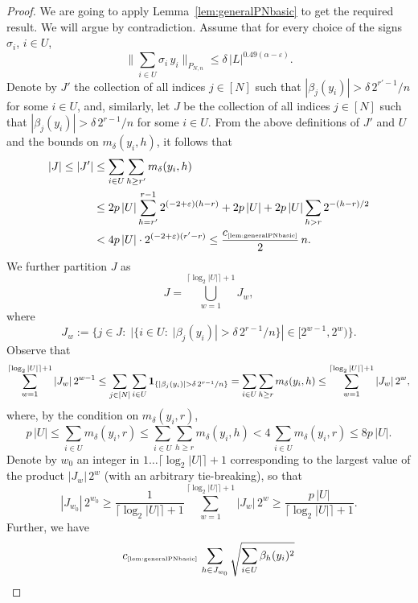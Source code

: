 \documentclass[11pt]{amsart}
\theoremstyle{definition}
\theoremstyle{plain}
\begin{document}
\begin{proof}
We are going to apply Lemma~\ref{lem:generalPNbasic}
to get the required result.
We will argue by contradiction.
Assume that for every
choice of the signs $\sigma_i$, $i\in U$,
\begin{equation}\label{eq:oajhbfoajhfboajsflaknf}
\Big\|\sum_{i\in U}\sigma_i\,y_i\Big\|_{P_{N,n}}
\leq \delta\,|L|^{0.49(\alpha-\varepsilon)}.    
\end{equation}
Denote by $J'$ the collection of all indices $j\in[N]$
such that 
$|\beta_j(y_i)|>\delta\,2^{r'-1}/n$
for some $i\in U$,
and, similarly, let $J$
be the collection of all indices $j\in[N]$
such that 
$|\beta_j(y_i)|>\delta\,2^{r-1}/n$
for some $i\in U$.
From the above definitions of $J'$ and $U$
and the bounds on $m_\delta(y_i,h)$, it follows that
\begin{equation}\label{eq: JJprimesize}
\begin{split}
|J|\leq
|J'|&\leq 
\sum_{i\in U}
\sum_{h\geq r'}
m_\delta(y_i,h)\\
&\leq
2p\,|U|
\sum_{h=r'}^{r-1} 2^{(-2+\varepsilon)(h-r)}
+2p\,|U|+2p\,|U|\sum_{h>r} 2^{-(h-r)/2}\\
&<
4p\,|U|
\cdot 2^{(-2+\varepsilon)(r'-r)}
\leq \frac{c_{\text{\tiny\ref{lem:generalPNbasic}}}}{2}\,n.
\end{split}
\end{equation}
We further partition $J$ as
$$
J=\bigcup\limits_{w=1}^{\lceil\log_2|U|\rceil+1} J_w,
$$
where
$$
J_w:=\big\{j\in J:\;
|\{i\in U:\;|\beta_j(y_i)|>\delta\,2^{r-1}/n\}|
\in[2^{w-1},2^w)\big\}.
$$
Observe that
$$
\sum_{w=1}^{\lceil\log_2|U|\rceil+1}
|J_w|\,2^{w-1}
\leq
\sum_{j\in[N]}\sum_{i\in U}
{\bf 1}_{\{|\beta_j(y_i)|>\delta\,2^{r-1}/n\}}
=\sum_{i\in U}\sum_{h\geq r}m_\delta(y_i,h)
\leq \sum_{w=1}^{\lceil\log_2|U|\rceil+1}
|J_w|\,2^{w},
$$
where, by the condition on $m_\delta(y_i,r)$,
$$
p\,|U|\leq
\sum_{i\in U}m_\delta(y_i,r)\leq
\sum_{i\in U}\sum_{h\geq r}m_\delta(y_i,h)
<4\,\sum_{i\in U}m_\delta(y_i,r)
\leq 8p\,|U|.
$$
Denote by $w_0$ an integer in $1\dots \lceil\log_2|U|\rceil+1$
corresponding to the largest value of the product $|J_w|\,2^{w}$
(with an arbitrary tie-breaking), so that
$$
|J_{w_0}|\,2^{w_0}
\geq \frac{1}{\lceil\log_2|U|\rceil+1}
\sum_{w=1}^{\lceil\log_2|U|\rceil+1}
|J_w|\,2^{w}
\geq \frac{p\,|U|}{\lceil\log_2|U|\rceil+1}.
$$
Further, we have
\begin{align}
c_{\text{\tiny\ref{lem:generalPNbasic}}}\,
\sum_{h\in J_{w_0}}\sqrt{\sum_{i\in U}\beta_h(y_i)^2}

\end{align}
\end{proof}
\end{document}
